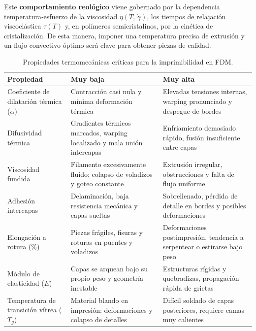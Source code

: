 Este \textbf{comportamiento reológico} viene gobernado por la dependencia temperatura‑esfuerzo de la viscosidad $\eta(T,\,\dot\gamma)$, los tiempos de relajación viscoelástica $\tau(T)$ y, en polímeros semicristalinos, por la cinética de cristalización. De esta manera, imponer una temperatura precisa de extrusión y un flujo convectivo óptimo será clave para obtener piezas de calidad.

\begin{table}[h]
  \centering
  \footnotesize
  \begin{tabular}{|p{3cm}|p{5cm}|p{5cm}|}
    \hline
    \textbf{Propiedad} & \textbf{Muy baja} & \textbf{Muy alta} \\
    \hline
    Coeficiente de dilatación térmica (\(\alpha\)) 
      & Contracción casi nula y mínima deformación térmica 
      & Elevadas tensiones internas, warping pronunciado y despegue de bordes \\
    \hline
    Difusividad térmica 
      & Gradientes térmicos marcados, warping localizado y mala unión intercapas 
      & Enfriamiento demasiado rápido, fusión insuficiente entre capas \\
    \hline
    Viscosidad fundida 
      & Filamento excesivamente fluido: colapso de voladizos y goteo constante 
      & Extrusión irregular, obstrucciones y falta de flujo uniforme \\
    \hline
    Adhesión intercapas 
      & Delaminación, baja resistencia mecánica y capas sueltas 
      & Sobrellenado, pérdida de detalle en bordes y posibles deformaciones \\
    \hline
    Elongación a rotura (\(\%\)) 
      & Piezas frágiles, fisuras y roturas en puentes y voladizos 
      & Deformaciones postimpresión, tendencia a serpentear o estirarse bajo peso \\
    \hline
    Módulo de elasticidad (\(E\)) 
      & Capas se arquean bajo su propio peso y geometría inestable 
      & Estructuras rígidas y quebradizas, propagación rápida de grietas \\
    \hline
    Temperatura de transición vítrea (\(T_g\)) 
      & Material blando en impresión: deformaciones y colapso de detalles 
      & Difícil soldado de capas posteriores, requiere camas muy calientes \\
    \hline
  \end{tabular}
  \caption{Propiedades termomecánicas críticas para la imprimibilidad en FDM.}
  \label{3param}
\end{table}

